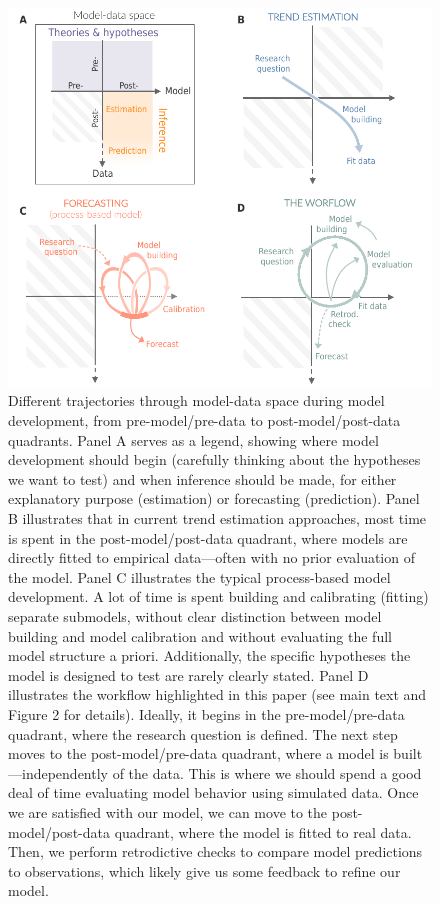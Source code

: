\documentclass[11pt]{article}
\begin{document}
\begin{figure}[h]
	\centering
	\includegraphics{../figures/figure_modeldataspaces_revised}
	\caption{Different trajectories through model-data space during model development, from pre-model/pre-data to post-model/post-data quadrants.
	Panel A serves as a legend, showing where model development should begin (carefully thinking about the hypotheses we want to test) and when inference should be made, for either explanatory purpose (estimation) or forecasting (prediction).
	Panel B illustrates that in current trend estimation approaches, most time is spent in the post-model/post-data quadrant, where models are directly fitted to empirical data---often with no prior evaluation of the model.
	Panel C illustrates the typical process-based model development. A lot of time is spent building and calibrating (fitting) separate submodels, without clear distinction between model building and model calibration and without evaluating the full model structure a priori. Additionally, the specific hypotheses the model is designed to test are rarely clearly stated.
	Panel D illustrates the workflow highlighted in this paper (see main text and Figure 2 for details). Ideally, it begins in the pre-model/pre-data quadrant, where the research question is defined. The next step moves to the post-model/pre-data quadrant, where a model is built---independently of the data. This is where we should spend a good deal of time evaluating model behavior using simulated data. Once we are satisfied with our model, we can move to the post-model/post-data quadrant, where the model is fitted to real data. Then, we perform retrodictive checks to compare model predictions to observations, which likely give us some feedback to refine our model.}
	\label{fig:modeldata}
\end{figure}
\end{document}
